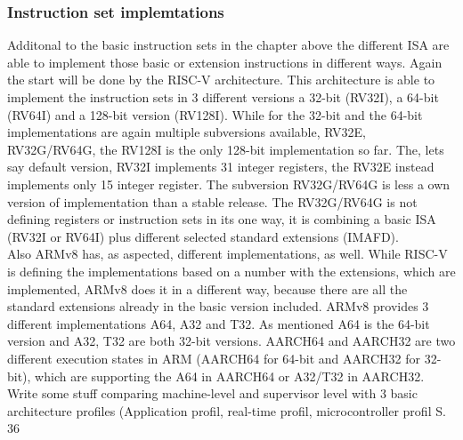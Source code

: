 \documentclass[conference]{IEEEtran}
\begin{document}
\subsubsection{Instruction set implemtations}
Additonal to the basic instruction sets in the chapter above the different \gls{ISA} are able to implement those basic or extension instructions in different ways. Again the start will be done by the RISC-V architecture. This architecture is able to implement the instruction sets in 3 different versions a 32-bit (RV32I), a 64-bit (RV64I) and a 128-bit version (RV128I).
While for the 32-bit and the 64-bit implementations are again multiple subversions available, RV32E, RV32G/RV64G, the RV128I is the only 128-bit implementation so far. The, lets say default version, RV32I implements 31 integer registers, the RV32E instead implements only 15 integer register. The subversion RV32G/RV64G is less a own version of implementation than a stable release. The RV32G/RV64G is not defining registers or instruction sets in its one way, it is combining a basic \gls{ISA} (RV32I or RV64I) plus different selected standard extensions (IMAFD). \cite{Asanovic2016} \\
Also ARMv8 has, as aspected, different implementations, as well. While RISC-V is defining the implementations based on a number with the extensions, which are implemented, ARMv8 does it in a different way, because there are all the standard extensions already in the basic version included.
ARMv8 provides 3 different implementations A64, A32 and T32. As mentioned A64 is the 64-bit version and A32, T32  are both 32-bit versions.
AARCH64 and AARCH32 are two different execution states in ARM (AARCH64 for 64-bit and AARCH32 for 32-bit), which are supporting the A64 in AARCH64 or A32/T32 in AARCH32.\cite{ArmManual}\\

Write some stuff comparing machine-level and supervisor level \cite{AndrewWaterman} with 3 basic architecture profiles (Application profil, real-time profil, microcontroller profil\cite{ArmManual} S. 36
\end{document}
